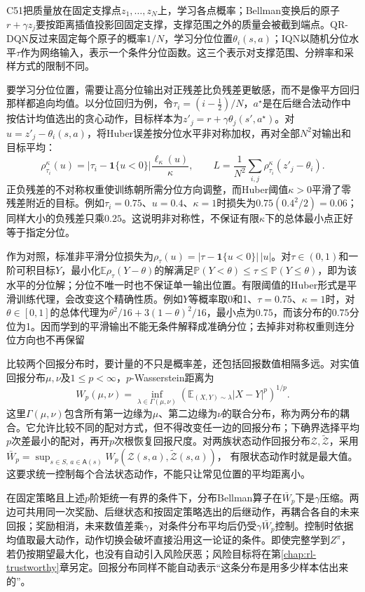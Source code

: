 C51把质量放在固定支撑点$z_1,\ldots,z_N$上，学习各点概率；Bellman变换后的原子$r+\gamma z_j$要按距离插值投影回固定支撑，支撑范围之外的质量会被截到端点。QR-DQN反过来固定每个原子的概率$1/N$，学习分位位置$\theta_i(s,a)$；IQN以随机分位水平$\tau$作为网络输入，表示一个条件分位函数。这三个表示对支撑范围、分辨率和采样方式的限制不同。

要学习分位位置，需要让高分位输出对正残差比负残差更敏感，而不是像平方回归那样都追向均值。以分位回归为例，令$\tau_i=(i-\tfrac12)/N$，$a^\star$是在后继合法动作中按估计均值选出的贪心动作，目标样本为$z'_j=r+\gamma\theta_j(s',a^\star)$。对$u=z'_j-\theta_i(s,a)$，将Huber误差按分位水平非对称加权，再对全部$N^2$对输出和目标平均：
\[
  \rho_{\tau_i}^{\kappa}(u)
      =|\tau_i-\mathbf1\{u<0\}|\frac{\ell_\kappa(u)}{\kappa},
  \qquad
  L=\frac1{N^2}\sum_{i,j}\rho_{\tau_i}^{\kappa}(z'_j-\theta_i).
\]
正负残差的不对称权重使训练朝所需分位方向调整，而Huber阈值$\kappa>0$平滑了零残差附近的目标。例如$\tau_i=0.75$、$u=0.4$、$\kappa=1$时损失为$0.75(0.4^2/2)=0.06$；同样大小的负残差只乘$0.25$。这说明非对称性，不保证有限$\kappa$下的总体最小点正好等于指定分位。

作为对照，标准非平滑分位损失为$\rho_\tau(u)=|\tau-\mathbf1\{u<0\}|\,|u|$。对$\tau\in(0,1)$和一阶可积目标$Y$，最小化$\mathbb E\rho_\tau(Y-\theta)$的解满足$\mathbb P(Y<\theta)\leq\tau\leq\mathbb P(Y\leq\theta)$，即为该水平的分位解；分位不唯一时也不保证单一输出位置。有限阈值的Huber形式是平滑训练代理，会改变这个精确性质。例如$Y$等概率取0和1、$\tau=0.75$、$\kappa=1$时，对$\theta\in[0,1]$的总体代理为$\theta^2/16+3(1-\theta)^2/16$，最小点为$0.75$，而该分布的$0.75$分位为1。因而学到的平滑输出不能无条件解释成准确分位；去掉非对称权重则连分位方向也不再保留

比较两个回报分布时，要计量的不只是概率差，还包括回报数值相隔多远。对实值回报分布$\mu,\nu$及$1\leq p<\infty$，$p$-Wasserstein距离为
\[
  W_p(\mu,\nu)=
    \inf_{\lambda\in\Gamma(\mu,\nu)}
       \left(\mathbb E_{(X,Y)\sim\lambda}|X-Y|^p\right)^{1/p}.
\]
这里$\Gamma(\mu,\nu)$包含所有第一边缘为$\mu$、第二边缘为$\nu$的联合分布，称为两分布的耦合。它允许比较不同的配对方式，但不得改变任一边的回报分布；下确界选择平均$p$次差最小的配对，再开$p$次根恢复回报尺度。对两族状态动作回报分布$\mathcal Z,\widetilde{\mathcal Z}$，采用
$\bar W_p=\sup_{s\in S,\,a\in\mathsf A(s)}
W_p(\mathcal Z(s,a),\widetilde{\mathcal Z}(s,a))$，
有限状态动作时就是最大值。这要求统一控制每个合法状态动作，不能只让常见位置的平均距离小。

在固定策略且上述$p$阶矩统一有界的条件下，分布Bellman算子在$\bar W_p$下是$\gamma$压缩。两边可共用同一次奖励、后继状态和按固定策略选出的后继动作，再耦合各自的未来回报；奖励相消，未来数值差乘$\gamma$，对条件分布平均后仍受$\gamma\bar W_p$控制。控制时依据均值取最大动作，动作切换会破坏直接沿用这一论证的条件。即使完整学到$Z^\pi$，若仍按期望最大化，也没有自动引入风险厌恶；风险目标将在第\ref{chap:rl-trustworthy}章另定。回报分布同样不能自动表示“这条分布是用多少样本估出来的”。

